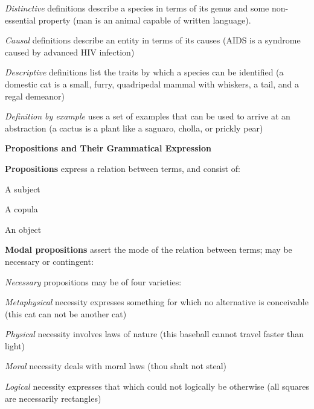 \documentclass{report}
\begin{document}
\begin{outline}
\begin{outline}
\begin{outline}
                \item \textit{Distinctive} definitions describe a species in terms of its genus and some non-essential property (man is an animal capable of written language).
                \item \textit{Causal} definitions describe an entity in terms of its causes (AIDS is a syndrome caused by advanced HIV infection)
                \item \textit{Descriptive} definitions list the traits by which a species can be identified (a domestic cat is a small, furry, quadripedal mammal with whiskers, a tail, and a regal demeanor)
                \item \textit{Definition by example} uses a set of examples that can be used to arrive at an abstraction (a cactus is a plant like a saguaro, cholla, or prickly pear)
                \end{outline}
    \end{outline}
  \item {\bf Propositions and Their Grammatical Expression}
  \begin{outline}
  \item {\bf Propositions} express a relation between terms, and consist of:
    \begin{outline}
      \item A subject
      \item A copula
      \item An object
    \end{outline}
    \newpage
  \item {\bf Modal propositions} assert the mode of the relation between terms; may be necessary or contingent:
    \begin{outline}
    \item \textit{Necessary} propositions may be of four varieties:
      \begin{outline}
        \item \textit{Metaphysical} necessity expresses something for which no alternative is conceivable (this cat can not be another cat)
        \item \textit{Physical} necessity involves laws of nature (this baseball cannot travel faster than light)
        \item \textit{Moral} necessity deals with moral laws (thou shalt not steal)
        \item \textit{Logical} necessity expresses that which could not logically be otherwise (all squares are necessarily rectangles)	

\end{outline}
\end{outline}
\end{outline}
\end{outline}
\end{document}
